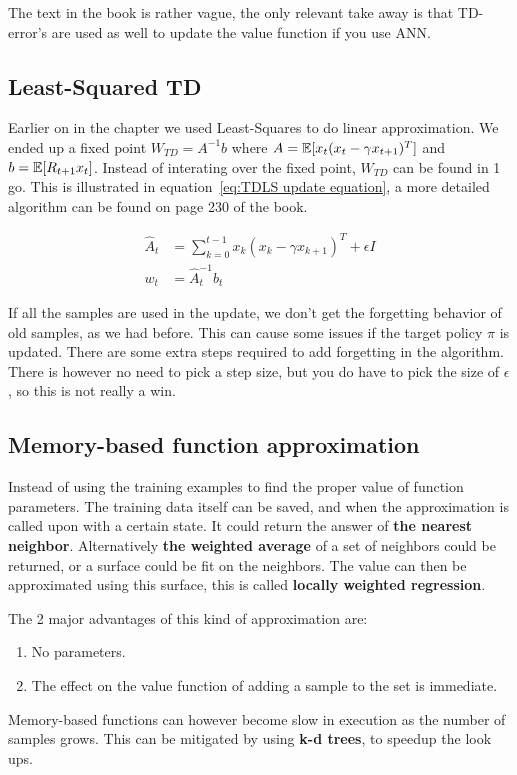 The text in the book is rather vague, the only relevant take away is that TD-error's are used as well to update the value function if you use ANN.

\subsection{Least-Squared TD}
Earlier on in the chapter we used Least-Squares to do linear approximation. We ended up a fixed point $W_{TD}=A^{-1}b$ where $A=\operatorname{\mathbb{E}}[x_t(x_t - \gamma x_{t+1})^T]$ and $b=\operatorname{\mathbb{E}}[R_{t+1}x_t]$. Instead of interating over the fixed point, $W_{TD}$ can be found in 1 go.  This is illustrated in equation~\ref{eq:TDLS update equation}, a more detailed algorithm can be found on page 230 of the book.

\begin{equation}
\begin{split}
\hat{A}_t & = \sum_{k=0}^{t-1}x_k(x_k - \gamma x_{k+1})^T + \epsilon I \\
w_t & = \hat{A}_t^{-1}b_t
\end{split}
\label{eq:TDLS update equation}
\end{equation}

If all the samples are used in the update, we don't get the forgetting behavior of old samples, as we had before. This can cause some issues if the target policy $\pi$ is updated. There are some extra steps required to add forgetting in the algorithm. There is however no need to pick a step size, but you do have to pick the size of $\epsilon$, so this is not really a win.

\subsection{Memory-based function approximation}

Instead of using the training examples to find the proper value of function parameters. The training data itself can be saved, and when the approximation is called upon with a certain state. It could return the answer of \textbf{the nearest neighbor}. Alternatively \textbf{the weighted average} of a set of neighbors could be returned, or a surface could be fit on the neighbors. The value can then be approximated using this surface, this is called \textbf{locally weighted regression}.

The 2 major advantages of this kind of approximation are:
\begin{enumerate}
	\item No parameters.
	\item The effect on the value function of adding a sample to the set is immediate.
\end{enumerate}
Memory-based functions can however become slow in execution as the number of samples grows. This can be mitigated by using \textbf{k-d trees}, to speedup the look ups.


